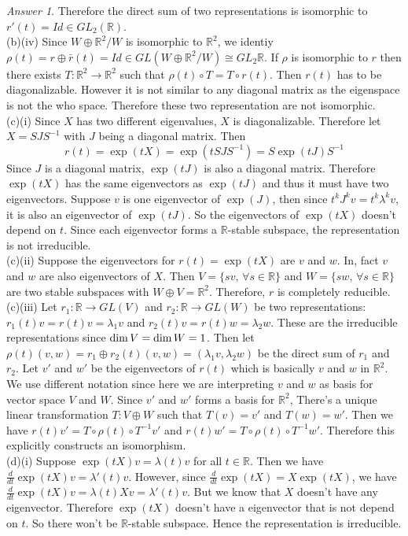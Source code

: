 \documentclass[10pt,a4paper]{article}
\theoremstyle{plain}
\theoremstyle{definition}
\theoremstyle{remark}
\newtheorem*{answer*}{Answer}
\newcommand{\IR}{\mathbb{R}}
\renewcommand\dim{{\rm dim\,}}
\newcommand{\<}{\langle}
\renewcommand{\>}{\rangle}
\newcommand{\ra}{\rightarrow}                   %
\newcommand{\isom}{\cong}
\begin{document}
\begin{answer*}
Therefore the direct sum of two representations is isomorphic to $r'(t) = Id\in GL_2(\IR)$. \\

(b)(iv) Since $W\oplus\IR^2/W$ is isomorphic to $\IR^2$, we identiy $\rho(t) = r\oplus\bar{r}(t) = Id\in GL(W\oplus\IR^2/W) \isom GL_2{\IR}$.  If $\rho$ is isomorphic to $r$ then there exists $T:\IR^2\ra \IR^2$ such that $\rho(t)\circ T = T \circ r(t)$. Then $r(t)$ has to be diagonalizable. However it is not similar to any diagonal matrix as the eigenspace is not the who space. Therefore these two representation are not isomorphic.\\

(c)(i) Since $X$ has two different eigenvalues, $X$ is diagonalizable. Therefore let $X = SJS^{-1}$ with $J$ being a diagonal matrix. Then $$r(t) = \exp(tX) = \exp(tSJS^{-1}) = S\exp(tJ)S^{-1}$$
Since $J$ is a diagonal matrix, $\exp(tJ)$ is also a diagonal matrix. Therefore $\exp(tX)$ has the same eigenvectors as $\exp(tJ)$ and thus it must have two eigenvectors. Suppose $v$ is one eigenvector of $\exp(J)$, then since $t^kJ^kv = t^k\lambda^k v$, it is also an eigenvector of $\exp(tJ)$. So the eigenvectors of $\exp(tX)$ doesn't depend on $t$. Since each eigenvector forms a $\IR$-stable subspace, the representation is not irreducible. \\

(c)(ii) Suppose the eigenvectors for $r(t) = \exp(tX)$ are $v$ and $w$. In, fact $v$ and $w$ are also eigenvectors of $X$. Then $V = \{sv,\, \forall s\in \IR\}$ and $W = \{sw,\, \forall s\in \IR\}$ are two stable subspaces with $W\oplus V = \IR^2$. Therefore, $r$ is completely reducible. \\

(c)(iii) Let $r_1:\IR \ra GL(V)$ and $r_2:\IR \ra GL(W)$ be two representations: $r_1(t)v = r(t)v = \lambda_1 v$ and $r_2(t)v = r(t)w = \lambda_2 w$. These are the irreducible representations since $\dim V = \dim W = 1$. Then let $\rho(t)(v,w) = r_1\oplus r_2(t)(v,w) = (\lambda_1 v, \lambda_2 w)$ be the direct sum of $r_1$ and $r_2$. Let $v'$ and $w'$ be the eigenvectors of $r(t)$ which is basically $v$ and $w$ in $\IR^2$.
We use different notation since here we are interpreting $v$ and $w$ as basis for vector space $V$ and $W$. Since $v'$ and $w'$ forms a basis for $\IR^2$, There's a unique linear transformation $T:V\oplus W$ such that $T(v) = v'$ and $T(w) = w'$. Then we have $r(t)v' = T\circ\rho(t)\circ T^{-1}v'$ and $r(t)w' = T\circ\rho(t)\circ T^{-1}w'$. Therefore this explicitly constructs an isomorphism. \\

(d)(i) Suppose $\exp(tX)v = \lambda(t)v$ for all $t\in \IR$. Then we have $\frac{d}{dt} \exp(tX) v = \lambda'(t)v$. However, since $\frac{d}{dt}\exp(tX) = X\exp(tX)$, we have $\frac{d}{dt} \exp(tX) v = \lambda(t)Xv = \lambda'(t)v$. But we know that $X$ doesn't have any eigenvector. Therefore $\exp(tX)$ doesn't have a eigenvector that is not depend on $t$. So there won't be $\IR$-stable subspace. Hence the representation is irreducible.\\
\end{answer*}
\end{document}
